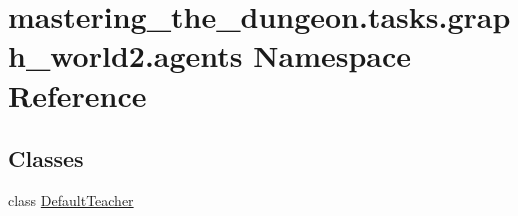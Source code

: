 \hypertarget{namespacemastering__the__dungeon_1_1tasks_1_1graph__world2_1_1agents}{}\section{mastering\+\_\+the\+\_\+dungeon.\+tasks.\+graph\+\_\+world2.\+agents Namespace Reference}
\label{namespacemastering__the__dungeon_1_1tasks_1_1graph__world2_1_1agents}
\subsection*{Classes}
\begin{DoxyCompactItemize}
\item 
class \hyperlink{classmastering__the__dungeon_1_1tasks_1_1graph__world2_1_1agents_1_1DefaultTeacher}{Default\+Teacher}
\end{DoxyCompactItemize}
